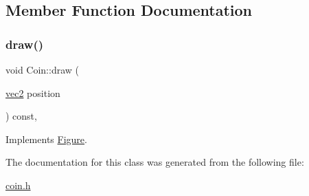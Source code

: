 \subsection{Member Function Documentation}
\mbox{\label{classCoin_a13812f35d85e19553fe36350c947204c}} 
\subsubsection{\texorpdfstring{draw()}{draw()}}
{\footnotesize\ttfamily void Coin\+::draw (\begin{DoxyParamCaption}\item[{\hyperlink{structvec2}{vec2}}]{position }\end{DoxyParamCaption}) const\hspace{0.3cm}{\ttfamily [inline]}, {\ttfamily [virtual]}}



Implements \hyperlink{classFigure_ac16583e764bdc244076957bf775e4866}{Figure}.



The documentation for this class was generated from the following file\+:\begin{DoxyCompactItemize}
\item 
\hyperlink{coin_8h}{coin.\+h}\end{DoxyCompactItemize}
